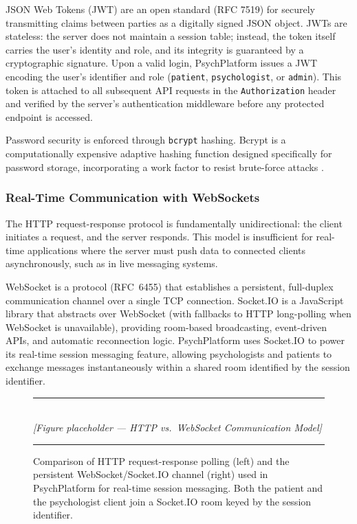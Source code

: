 JSON Web Tokens (JWT) are an open standard (RFC 7519) for securely transmitting
claims between parties as a digitally signed JSON object. JWTs are stateless:
the server does not maintain a session table; instead, the token itself carries
the user's identity and role, and its integrity is guaranteed by a cryptographic
signature. Upon a valid login, PsychPlatform issues a JWT encoding the user's
identifier and role (\texttt{patient}, \texttt{psychologist}, or
\texttt{admin}). This token is attached to all subsequent API requests in the
\texttt{Authorization} header and verified by the server's authentication
middleware before any protected endpoint is accessed.

Password security is enforced through \texttt{bcrypt} hashing. Bcrypt is a
computationally expensive adaptive hashing function designed specifically for
password storage, incorporating a work factor to resist brute-force attacks
\cite{Provos1999}.

\subsubsection{Real-Time Communication with WebSockets}

The HTTP request-response protocol is fundamentally unidirectional: the client
initiates a request, and the server responds. This model is insufficient for
real-time applications where the server must push data to connected clients
asynchronously, such as in live messaging systems.

WebSocket is a protocol (RFC~6455) that establishes a persistent, full-duplex
communication channel over a single TCP connection. Socket.IO is a JavaScript
library that abstracts over WebSocket (with fallbacks to HTTP long-polling when
WebSocket is unavailable), providing room-based broadcasting, event-driven APIs,
and automatic reconnection logic. PsychPlatform uses Socket.IO to power its
real-time session messaging feature, allowing psychologists and patients to
exchange messages instantaneously within a shared room identified by the session
identifier.

\begin{figure}[H]
  \centering
  \rule{0.85\textwidth}{0.4pt}\\[6pt]
  {\small\itshape [Figure placeholder — HTTP vs.\ WebSocket Communication Model]}
  \rule{0.85\textwidth}{0.4pt}
  \caption{Comparison of HTTP request-response polling (left) and the persistent
           WebSocket/Socket.IO channel (right) used in PsychPlatform for real-time
           session messaging. Both the patient and the psychologist client join
           a Socket.IO room keyed by the session identifier.}
  \label{fig:websocket}
\end{figure}

